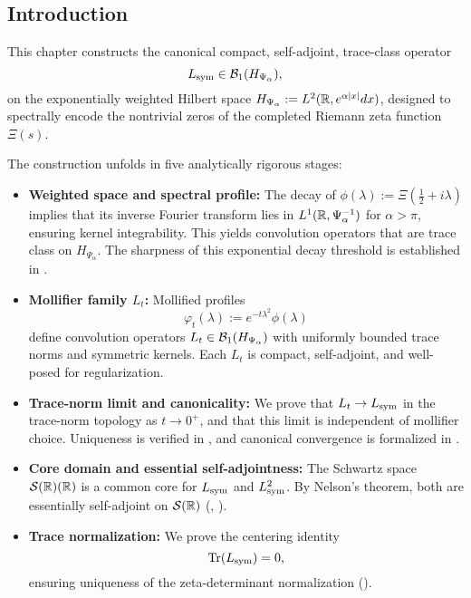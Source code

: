 \subsection*{Introduction}

This chapter constructs the canonical compact, self-adjoint, trace-class operator
\[
L_{\mathrm{sym}} \in \mathcal{B}_1(H_{\Psi_\alpha}),
\]
on the exponentially weighted Hilbert space \( H_{\Psi_\alpha} := L^2(\mathbb{R}, e^{\alpha |x|} dx) \), designed to spectrally encode the nontrivial zeros of the completed Riemann zeta function \( \Xi(s) \).

The construction unfolds in five analytically rigorous stages:

\begin{itemize}
    \item \textbf{Weighted space and spectral profile:} The decay of \( \phi(\lambda) := \Xi(\tfrac{1}{2} + i\lambda) \) implies that its inverse Fourier transform lies in \( L^1(\mathbb{R}, \Psi_\alpha^{-1}) \) for \( \alpha > \pi \), ensuring kernel integrability. This yields convolution operators that are trace class on \( H_{\Psi_\alpha} \). The sharpness of this exponential decay threshold is established in .

    \item \textbf{Mollifier family \( L_t \):} Mollified profiles
    \[
    \varphi_t(\lambda) := e^{-t\lambda^2} \phi(\lambda)
    \]
    define convolution operators \( L_t \in \mathcal{B}_1(H_{\Psi_\alpha}) \) with uniformly bounded trace norms and symmetric kernels. Each \( L_t \) is compact, self-adjoint, and well-posed for regularization.

    \item \textbf{Trace-norm limit and canonicality:} We prove that \( L_t \to L_{\mathrm{sym}} \) in the trace-norm topology as \( t \to 0^+ \), and that this limit is independent of mollifier choice. Uniqueness is verified in , and canonical convergence is formalized in .

    \item \textbf{Core domain and essential self-adjointness:} The Schwartz space \( \mathcal{S}(\mathbb{R})(\mathbb{R}) \) is a common core for \( L_{\mathrm{sym}} \) and \( L_{\mathrm{sym}}^2 \). By Nelson’s theorem, both are essentially self-adjoint on \( \mathcal{S}(\mathbb{R}) \) (, ).

    \item \textbf{Trace normalization:} We prove the centering identity
    \[
    \operatorname{Tr}(L_{\mathrm{sym}}) = 0,
    \]
    ensuring uniqueness of the zeta-determinant normalization ().
\end{itemize}

